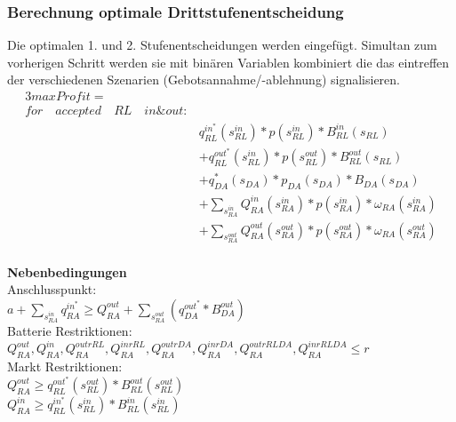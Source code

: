 \subsubsection{Berechnung optimale Drittstufenentscheidung}
Die optimalen 1. und 2. Stufenentscheidungen werden eingefügt. Simultan zum vorherigen Schritt werden sie mit binären Variablen kombiniert die das eintreffen der verschiedenen Szenarien (Gebotsannahme/-ablehnung) signalisieren.
\begin{alignat*}{3}
	max Profit  =                             &                                                                                                \\
	for\quad accepted\quad RL\quad in \& out: &                                                                                                \\
	                                          & q^{in^*}_{RL} (s^{in}_{RL}) * p(s^{in}_{RL}) * B^{in}_{RL} (s_{RL})                            \\
	                                          & + q^{out^*}_{RL}(s^{in}_{RL}) * p(s^{out}_{RL}) * B^{out}_{RL} (s_{RL})                        \\
	                                          & + q^*_{DA}(s_{DA}) * p_{DA}(s_{DA}) * B_{DA}(s_{DA})                                           \\
	                                          & + \sum_{s^{in}_{RA}} Q^{in}_{RA}(s^{in}_{RA}) * p(s^{in}_{RA}) * \omega_{RA}(s^{in}_{RA})      \\
	                                          & + \sum_{s^{out}_{RA}} Q^{out}_{RA}(s^{out}_{RA}) * p(s^{out}_{RA}) * \omega_{RA}(s^{out}_{RA}) \\
\end{alignat*}





\textbf{Nebenbedingungen}\\
Anschlusspunkt:\\
$a + \sum_{s^{in}_{RA}} q^{in^*}_{RA} \geq Q^{out}_{RA} + \sum_{s^{out}_{RA}}(q^{out^*}_{DA} * B^{out}_{DA})$ \\
Batterie Restriktionen:\\
$Q^{out}_{RA}, Q^{in}_{RA}, Q^{outrRL}_{RA}, Q^{inrRL}_{RA}, Q^{outrDA}_{RA}, Q^{inrDA}_{RA}, Q^{outrRLDA}_{RA}, Q^{inrRLDA}_{RA} \leq r$\\
Markt Restriktionen:\\
$Q^{out}_{RA} \geq q^{out^*}_{RL} (s^{out}_{RL}) * B^{out}_{RL} (s^{out}_{RL}) $\\
$Q^{in}_{RA} \geq q^{in^*}_{RL} (s^{in}_{RL}) * B^{in}_{RL} (s^{in}_{RL}) $\\

